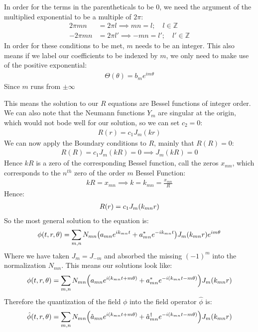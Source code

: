 \documentclass[12pt]{article}
\begin{document}
In order for the terms in the parentheticals to be $0$, we need the argument of the multiplied exponential to be a multiple of $2\pi$:
\begin{align*}
  2\pi mn&=2\pi l\implies m n = l;\quad l\in\mathbb{Z}\\
  -2\pi mn&=2\pi l'\implies -m n = l';\quad l'\in\mathbb{Z}
\end{align*}
In order for these conditions to be met, $m$ needs to be an integer. This also means if we label our coefficients to be indexed by $m$, we only need to make use of the positive exponential:
\begin{align*}
  \Theta(\theta)=b_me^{im\theta}
\end{align*}
Since $m$ runs from $\pm\infty$

This means the solution to our $R$ equations are Bessel functions of integer order. We can also note that the Neumann functions $Y_m$ are singular at the origin, which would not bode well for our solution, so we can set $c_2=0$:
\begin{align*}
  R(r)=c_1J_m(kr)
\end{align*}
We can now apply the Boundary conditions to $R$, mainly that $R(R)=0$:
\begin{align*}
  R(R)=c_1J_m(kR)=0\implies J_m(kR)=0
\end{align*}
Hence $kR$ is a zero of the corresponding Bessel function, call the zeros $x_{mn}$, which corresponds to the $n^{th}$ zero of the order $m$ Bessel Function:
\begin{align*}
  k R= x_{mn}\implies k=k_{mn}= \frac{x_{mn}}{R}
\end{align*}
Hence:
\begin{align*}
  R(r)=c_1J_m\qty(k_{mn}r)
\end{align*}
So the most general solution to the equation is:
\begin{align*}
  \phi(t,r,\theta)=\sum_{m,n}N_{mn}\qty(a_{mn}e^{ik_{mn}t}+a^*_{mn}e^{-ik_{mn}t})
  J_m(k_{mn}r)e^{im\theta}
\end{align*}
Where we have taken $J_{m}=J_{-m}$ and absorbed the missing $(-1)^m$ into the normalization $N_{mn}$. This means our solutions look like:
\begin{align*}
  \phi(t,r,\theta)=\sum_{m,n}N_{mn}
  \qty(a_{mn}e^{i(k_{mn}t+m\theta)}+a^*_{mn}e^{-i(k_{mn}t-m\theta)})J_m(k_{mn}r)
\end{align*}
Therefore the quantization of the field $\phi$ into the field operator $\hat\phi$ is:
\begin{align*}
  \hat\phi(t,r,\theta)=\sum_{m,n}N_{mn}\qty(
  \hat{a}_{mn}e^{i(k_{mn}t+m\theta)}+\hat{a}^\dag_{mn}e^{-i(k_{mn}t-m\theta)})
  J_m(k_{mn}r)
\end{align*}
\end{document}
